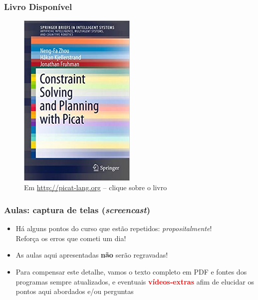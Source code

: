 \begin{frame}
\frametitle{Livro Disponível}

\begin{figure}[ht!]
\begin{center}
\includegraphics[width=0.5\textwidth, height=0.70\textheight]{figures/livro_picat.jpg}
\caption{Em \url{http://picat-lang.org} -- clique sobre o livro}
\end{center}
\end{figure}


\end{frame}





    
\begin{frame}[fragile]
  \frametitle{Aulas: captura de telas (\textit{screencast})}
  \begin{itemize}

    \item Há alguns pontos do curso que estão repetidos: \textit{propositalmente}!\\
    \pause
    Reforça os erros que cometi um dia!

    \pause
    \item As aulas aqui apresentadas \textbf{não} serão regravadas!
        
    \pause 
    \item Para compensar este detalhe, vamos o texto completo em PDF e fontes dos programas sempre atualizados,
    e eventuais \textcolor{red}{\textbf{vídeos-extras}} afim de  elucidar os pontos aqui abordados e/ou perguntas
    
    
  \end{itemize}

\end{frame}


